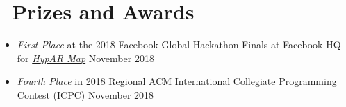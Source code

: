 \documentclass[10pt,letterpaper]{article}
\begin{document}
\section*{\faTrophy\ Prizes and Awards}
\begin{itemize}
    \item \textit{First Place} at the 2018 Facebook Global Hackathon Finals at
        Facebook HQ for
        \href{https://sumnerevans.com/pages/portfolio.html#HypAR-Map}{\textit{HypAR Map}}
        \hfill November 2018
    \item \textit{Fourth Place} in 2018 Regional ACM International Collegiate
        Programming Contest (ICPC) \hfill November 2018
\end{itemize}

\end{document}
